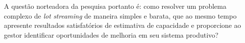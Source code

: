 A questão norteadora da pesquisa portanto é: como resolver um problema complexo de \textit{lot streaming} de maneira simples e barata, que ao mesmo tempo apresente resultados satisfatórios de estimativa de capacidade e proporcione ao gestor identificar oportunidades de melhoria em seu sistema produtivo?

    